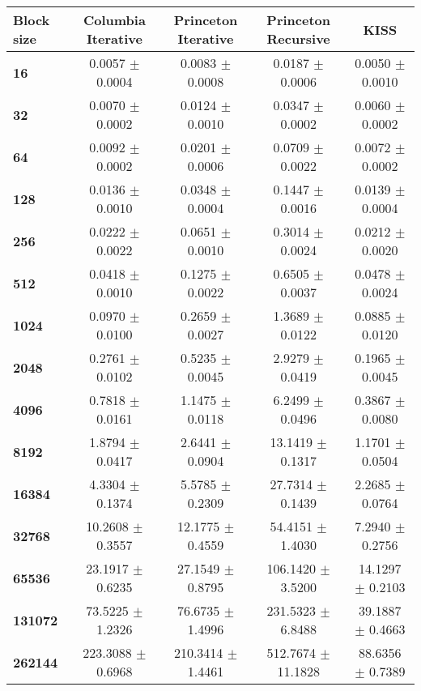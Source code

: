 \begin{tabular}{lcccc}\toprule
    \textbf{Block size} & \textbf{Columbia Iterative} & \textbf{Princeton Iterative} & \textbf{Princeton Recursive} & \textbf{KISS}\\\midrule
\textbf{16}     & 0.0057 $\pm$ 0.0004   & 0.0083 $\pm$ 0.0008 & 0.0187 $\pm$ 0.0006      & 0.0050 $\pm$ 0.0010  \\
\textbf{32}     & 0.0070 $\pm$ 0.0002   & 0.0124 $\pm$ 0.0010 & 0.0347 $\pm$ 0.0002      & 0.0060 $\pm$ 0.0002  \\
\textbf{64}     & 0.0092 $\pm$ 0.0002   & 0.0201 $\pm$ 0.0006 & 0.0709 $\pm$ 0.0022      & 0.0072 $\pm$ 0.0002  \\
\textbf{128}    & 0.0136 $\pm$ 0.0010   & 0.0348 $\pm$ 0.0004 & 0.1447 $\pm$ 0.0016      & 0.0139 $\pm$ 0.0004  \\
\textbf{256}    & 0.0222 $\pm$ 0.0022   & 0.0651 $\pm$ 0.0010 & 0.3014 $\pm$ 0.0024      & 0.0212 $\pm$ 0.0020  \\
\textbf{512}    & 0.0418 $\pm$ 0.0010   & 0.1275 $\pm$ 0.0022 & 0.6505 $\pm$ 0.0037      & 0.0478 $\pm$ 0.0024  \\
\textbf{1024}   & 0.0970 $\pm$ 0.0100   & 0.2659 $\pm$ 0.0027 & 1.3689 $\pm$ 0.0122      & 0.0885 $\pm$ 0.0120  \\
\textbf{2048}   & 0.2761 $\pm$ 0.0102   & 0.5235 $\pm$ 0.0045 & 2.9279 $\pm$ 0.0419      & 0.1965 $\pm$ 0.0045  \\
\textbf{4096}   & 0.7818 $\pm$ 0.0161   & 1.1475 $\pm$ 0.0118 & 6.2499 $\pm$ 0.0496      & 0.3867 $\pm$ 0.0080  \\
\textbf{8192}   & 1.8794 $\pm$ 0.0417   & 2.6441 $\pm$ 0.0904 & 13.1419 $\pm$ 0.1317     & 1.1701 $\pm$ 0.0504  \\
\textbf{16384}  & 4.3304 $\pm$ 0.1374   & 5.5785 $\pm$ 0.2309 & 27.7314 $\pm$ 0.1439     & 2.2685 $\pm$ 0.0764  \\
\textbf{32768}  & 10.2608 $\pm$ 0.3557  & 12.1775 $\pm$ 0.4559 & 54.4151 $\pm$ 1.4030    & 7.2940 $\pm$ 0.2756  \\
\textbf{65536}  & 23.1917 $\pm$ 0.6235  & 27.1549 $\pm$ 0.8795 & 106.1420 $\pm$ 3.5200   & 14.1297 $\pm$ 0.2103 \\
\textbf{131072} & 73.5225 $\pm$ 1.2326  & 76.6735 $\pm$ 1.4996 & 231.5323 $\pm$ 6.8488   & 39.1887 $\pm$ 0.4663 \\
\textbf{262144} & 223.3088 $\pm$ 0.6968 & 210.3414 $\pm$ 1.4461 & 512.7674 $\pm$ 11.1828 & 88.6356 $\pm$ 0.7389 \\
\bottomrule
\end{tabular}

